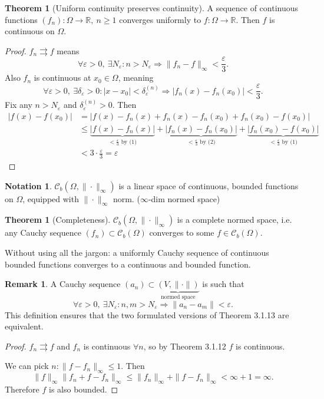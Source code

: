\documentclass[a4paper]{article}
\theoremstyle{definition}
\newtheorem{thm}[defn]{Theorem}
\newtheorem*{remark}{Remark}
\newtheorem*{notation}{Notation}
\begin{document}
\begin{thm}[Uniform continuity preserves continuity]
A sequence of continuous functions $(f_n):\Omega \rightarrow \mathbb R,\ n\geq 1$ converges uniformly to $f:\Omega \rightarrow \mathbb R$. Then $f$ is continuous on $\Omega$.
\end{thm}
\begin{proof}
$f_n\rightrightarrows f$ means \begin{equation}\forall \varepsilon >0, \ \exists N_\varepsilon : n>N_\varepsilon \Rightarrow \|f_n-f\|_\infty < \frac{\varepsilon}{3} .\end{equation} Also $f_n$ is continuous at $x_0\in \Omega$, meaning \begin{equation}\forall \varepsilon >0, \ \exists \delta_\varepsilon >0 : |x-x_0|<\delta_\varepsilon^{(n)} \Rightarrow |f_n(x)-f_n(x_0)|<\frac{\varepsilon}{3} .\end{equation} Fix any $n>N_\varepsilon$ and $\delta_\varepsilon^{(n)} >0$. Then
\[
\begin{aligned}|f(x)-f(x_0)|&=|f(x)-f_n(x)+f_n(x)-f_n(x_0)+f_n(x_0)-f(x_0)|\\&\leq \underbrace{|f(x)-f_n(x)|}_{<\frac{\varepsilon}{3}\text{ by (1)}}+\underbrace{|f_n(x)-f_n(x_0)|}_{<\frac{\varepsilon}{3}\text{ by (2)}}+\underbrace{|f_n(x_0)-f(x_0)|}_{<\frac{\varepsilon}{3}\text{ by (1)}} \\ &<3\cdot \frac{\varepsilon}{3}=\varepsilon\end{aligned}
\]
\end{proof}
\begin{notation}
$\mathcal C_b (\Omega, \|\cdot\|_\infty)$ is a linear space of continuous, bounded functions on $\Omega$, equipped with $\|\cdot \|_\infty$ norm. ($\infty$-dim normed space)
\end{notation}
\begin{thm}[Completeness]
$\mathcal C_b (\Omega, \|\cdot\|_\infty)$ is a complete normed space, i.e. any Cauchy sequence $(f_n)\subset \mathcal C_b(\Omega)$ converges to some $f\in \mathcal C_b (\Omega)$.

Without using all the jargon: a uniformly Cauchy sequence of continuous bounded functions converges to a continuous and bounded function.
\end{thm}
\begin{remark}
A Cauchy sequence $(a_n)\subset \underbrace{(V,\|\cdot\|)}_{\text{normed space}}$ is such that
\[
\forall \varepsilon >0,\ \exists N_\varepsilon : n,m>N_\varepsilon \Rightarrow \|a_n-a_m\|<\varepsilon .
\]
This definition ensures that the two formulated versions of Theorem 3.1.13 are equivalent.
\end{remark}
\begin{proof}
$f_n \rightrightarrows f$ and $f_n$ is continuous $\forall n$, so by Theorem 3.1.12 $f$ is continuous.

We can pick $n:\|f-f_n\|_\infty \leq 1$. Then
\[
\|f\|_\infty \|f_n+f-f_n\|_\infty \leq \|f_n\|_\infty+\|f-f_n\|_\infty <\infty+1=\infty .
\]
Therefore $f$ is also bounded.
\end{proof}
\end{document}

